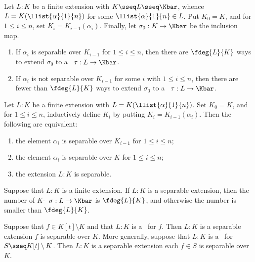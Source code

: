 \documentclass[a4paper]{article}
\begin{document}
\begin{ttheorem}
  Let \( L:K \) be a finite extension with \( K\sseq L\sseq \Kbar \), whence \( L=K(\llist{\alpha}{1}{n}) \) for some \( \llist{\alpha}{1}{n}\in L \).
  Put \( K_0=K \), and for \( 1\leq i\leq n \), set \( K_i=K_{i-1}(\alpha_i) \).
  Finally, let \( \sigma_0:K\to\Kbar \) be the inclusion map. \begin{enumerate}[label=(\roman*)]
    \item If \( \alpha_i \) is separable over \( K_{i-1} \) for \( 1\leq i\leq n \), then there are \( \fdeg{L}{K} \) ways to extend \( \sigma_0 \) to a \homo~\( \tau:L\to \Kbar \).
    \item If \( \alpha_i \) is not separable over \( K_{i-1} \) for some \( i \) with \( 1\leq i\leq n \), then there are fewer than \( \fdeg{L}{K} \) ways to extend \( \sigma_0 \) to a \homo~\( \tau:L\to \Kbar \).
  \end{enumerate}
\end{ttheorem}

\begin{ttheorem}
  Let \( L:K \) be a finite extension with \( L=K(\llist{\alpha}{1}{n}) \).
  Set \( K_0=K \), and for \( 1\leq i\leq n \), inductively define \( K_i \) by putting \( K_i=K_{i-1}(\alpha_i) \).
  Then the following are equivalent: \begin{enumerate}[label=(\roman*)]
    \item the element \( \alpha_i \) is separable over \( K_{i-1} \) for \( 1\leq i\leq n \);
    \item the element \( \alpha_i \) is separable over \( K \) for \( 1\leq i\leq n \);
    \item the extension \( L:K \) is separable.
  \end{enumerate}
\end{ttheorem}

\begin{tcorollary}
  Suppose that \( L:K \) is a finite extension.
  If \( L:K \) is a separable extension, then the number of \( K \)-\homo~\( \sigma:L\to\Kbar \) is \( \fdeg{L}{K} \), and otherwise the number is smaller than \( \fdeg{L}{K} \).
\end{tcorollary}

\begin{tcorollary}
  Suppose that \( f\in K[t]\setminus K \) and that \( L:K \) is a \sfe~for \( f \).
  Then \( L:K \) is a separable extension \iff \( f \) is separable over \( K \).
  More generally, suppose that \( L:K \) is a \sfe~for \( S\sseq K[t]\setminus K \).
  Then \( L:K \) is a separable extension \iff each \( f\in S \) is separable over \( K \).
\end{tcorollary}
\end{document}
